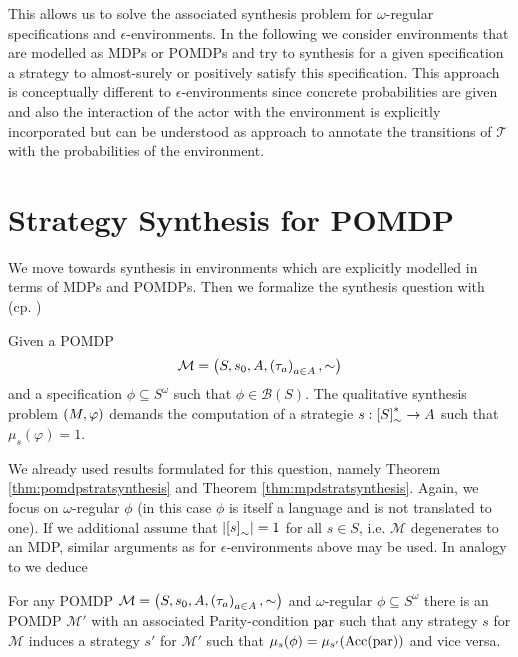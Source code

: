 This allows us to solve the associated synthesis problem for $\omega$-regular
specifications and $\epsilon$-environments. In the following we consider 
environments that are modelled as \acp{MDP} or \acp{POMDP} and try to synthesis
for a given specification a strategy to almost-surely or positively satisfy 
this specification. This approach is conceptually different to 
$\epsilon$-environments since concrete probabilities are given and also the 
interaction of the actor with the environment is explicitly incorporated but 
can be understood as approach to annotate the transitions of $\mathcal{T}$
with the probabilities of the environment.

\section{Strategy Synthesis for \ac{POMDP}}
We move towards synthesis in environments which are explicitly modelled in 
terms of \acp{MDP} and \acp{POMDP}. Then we formalize the synthesis question 
with (cp. \cite{QualAnaPOMDP, SimpleStochasticParityGames, 
ComplexProbVerification})
\begin{definition}
  Given a \ac{POMDP} 
  \begin{equation*}
    \mathcal{M} = \left(S, s_{0}, A, \left(\tau_{a}\right)_{a\in A}, \sim\right)
  \end{equation*}
  and a specification $\phi\subseteq S^{\omega}$ such that 
  $\phi\in\mathcal{B}(S)$. The qualitative synthesis problem 
  $\left(M, \varphi\right)$ demands the computation of a strategie 
  $s:\left[S\right]_{\sim}^{*}\rightarrow A$ such that $\mu_{s}(\varphi) = 1$.
\end{definition}
We already used results formulated for this question, namely Theorem 
\ref{thm:pomdpstratsynthesis} and Theorem \ref{thm:mpdstratsynthesis}. Again,
we focus on $\omega$-regular $\phi$ (in this case $\phi$ is itself a language
and is not translated to one). If we additional assume that 
$\left\vert{\left[s\right]_{\sim}}\right\vert = 1$ for all $s\in S$, i.e. $\mathcal{M}$ 
degenerates to an \ac{MDP}, similar arguments as for $\epsilon$-environments 
above may be used. In analogy to 
\cite[Proposition 4.2.3.]{ComplexProbVerification} we deduce
\begin{lemma}
  For any \ac{POMDP} $\mathcal{M} = \left(S, s_{0}, A, 
  \left(\tau_{a}\right)_{a\in A}, \sim\right)$ and $\omega$-regular 
  $\phi\subseteq S^{\omega}$ there is an \ac{POMDP} $\mathcal{M'}$ with an 
  associated Parity-condition $\operatorname{par}$ such that any strategy $s$ for 
  $\mathcal{M}$ induces a strategy $s'$ for $\mathcal{M'}$ such that 
  $\mu_{s}(\phi) = \mu_{s'}(\operatorname{Acc}(\operatorname{par}))$ and vice versa.
  \label{lem:POMDPomegareg}
\end{lemma}
